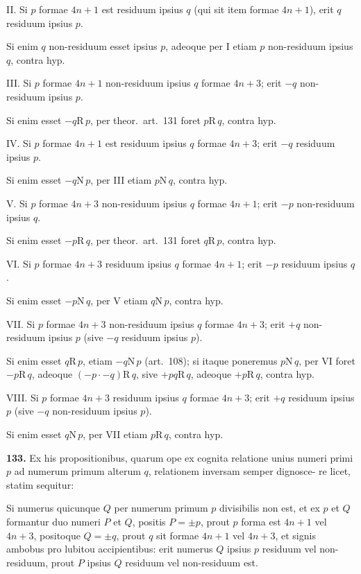 \documentclass[12pt,a4paper]{article}
\newcommand{\R}{\mbox{R}}
\newcommand{\N}{\mbox{N}}
\begin{document}
II. Si $p$ formae $4n+1$ est residuum ipsius $q$ (qui sit item formae
$4n+1$), erit $q$ residuum ipsius $p$.

Si enim $q$ non-residuum esset ipsius $p$, adeoque per I etiam $p$ non-residuum
ipsius $q$, contra hyp.

III. Si $p$ formae $4n+1$ non-residuum ipsius $q$ formae $4n+3$; erit
$-q$ non-residuum ipsius $p$.

Si enim esset $-q \R\, p$, per theor.\ art.~131 foret $p \R\, q$, contra hyp.

IV. Si $p$ formae $4n+1$ est residuum ipsius $q$ formae $4n+3$; erit
$-q$ residuum ipsius $p$.

Si enim esset $-q \N\, p$, per III etiam $p \N\, q$, contra hyp.

V. Si $p$ formae $4n+3$ non-residuum ipsius $q$ formae $4n+1$; erit
$-p$ non-residuum ipsius $q$.

Si enim esset $-p \R\, q$, per theor.\ art.~131 foret $q \R\, p$, contra hyp.

VI. Si $p$ formae $4n+3$ residuum ipsius $q$ formae $4n+1$; erit
$-p$ residuum ipsius $q$.

Si enim esset $-p \N\, q$, per V etiam $q \N\, p$, contra hyp.

VII. Si $p$ formae $4n+3$ non-residuum ipsius $q$ formae $4n+3$; erit
$+q$ non-residuum ipsius $p$ (sive $-q$ residuum ipsius $p$).

Si enim esset $q \R\, p$, etiam $-q \N\, p$ (art.~108); si itaque poneremus
$p \N\, q$, per VI foret $-p \R\, q$, adeoque $(-p \cdot -q) \R\, q$, sive $+pq \R\, q$,
adeoque $+p \R\, q$, contra hyp.

VIII. Si $p$ formae $4n+3$ residuum ipsius $q$ formae $4n+3$; erit $+q$
residuum ipsius $p$ (sive $-q$ non-residuum ipsius $p$).

Si enim esset $q \N\, p$, per VII etiam $p \R\, q$, contra hyp.

\textbf{133.}
Ex his propositionibus, quarum ope ex cognita relatione unius numeri
primi $p$ ad numerum primum alterum $q$, relationem inversam semper dignosce-
re licet, statim sequitur:

Si numerus quicunque $Q$ per numerum primum $p$ divisibilis non est,
et ex $p$ et $Q$ formantur duo numeri $P$ et $Q$, positis $P = \pm p$, prout $p$
forma est $4n+1$ vel $4n+3$, positoque $Q = \pm q$, prout $q$ sit formae $4n+1$
vel $4n+3$, et signis ambobus pro lubitou accipientibus: erit numerus $Q$ ipsius
$p$ residuum vel non-residuum, prout $P$ ipsius $Q$ residuum vel non-residuum est.
\end{document}
